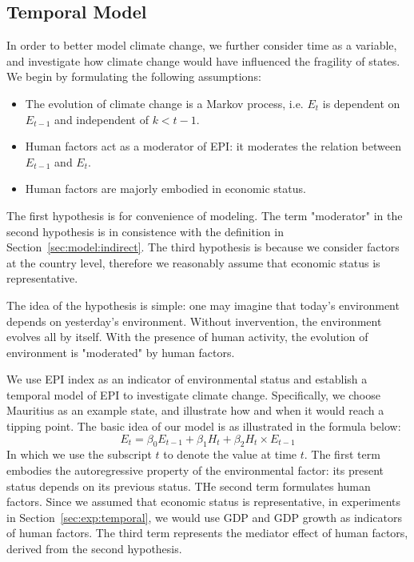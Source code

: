
\subsection{Temporal Model}
\label{sec:model2}
In order to better model climate change, we further consider time as a variable, and investigate how climate change would have influenced the fragility of states. 
We begin by formulating the following assumptions:
\begin{itemize}
    \item The evolution of climate change is a Markov process, i.e. $E_t$ is dependent on $E_{t-1}$ and independent of $k<t-1$.
    \item Human factors act as a moderator of EPI: it moderates the relation between $E_{t-1}$ and $E_t$.
    \item Human factors are majorly embodied in economic status.
\end{itemize}
The first hypothesis is for convenience of modeling. The term "moderator" in the second hypothesis is in consistence with the definition in Section~\ref{sec:model:indirect}. The third hypothesis is because we consider factors at the country level, therefore we reasonably assume that economic status is representative.

The idea of the hypothesis is simple: one may imagine that today's environment depends on yesterday's environment. Without invervention, the environment evolves all by itself. With the presence of human activity, the evolution of environment is "moderated" by human factors. 

We use EPI index as an indicator of environmental status and establish a temporal model of EPI to investigate climate change.
Specifically, we choose Mauritius as an example state, and illustrate how and when it would reach a tipping point. The basic idea of our model is as illustrated in the formula below:
\begin{equation}
   E_t = \beta_0 E_{t-1} + \beta_1 H_{t} + \beta_2 H_{t}\times E_{t-1}
   \label{eqn:mod:temporal_idea}
\end{equation}
In which we use the subscript $t$ to denote the value at time $t$.
The first term embodies the autoregressive property of the environmental factor: its present status depends on its previous status. 
THe second term formulates human factors. Since we assumed that economic status is representative, in experiments in Section~\ref{sec:exp:temporal}, we would use GDP and GDP growth as indicators of human factors.
The third term represents the mediator effect of human factors, derived from the second hypothesis. 

